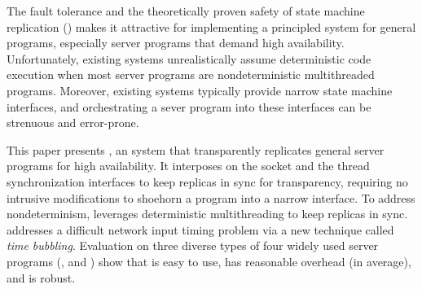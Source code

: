 The fault tolerance and the theoretically proven safety of state machine
replication (\smr) makes it attractive for implementing a principled
system for general programs, especially server programs that demand high
availability.  Unfortunately, existing \smr systems unrealistically assume
deterministic code execution when most server programs are
nondeterministic multithreaded programs.  Moreover, existing \smr systems
typically provide narrow state machine interfaces, and orchestrating a
sever program into these interfaces can be strenuous and error-prone.

This paper presents \xxx, an \smr system that transparently replicates
general server programs for high availability.  It interposes on the
socket and the thread synchronization interfaces to keep replicas in sync
for transparency, requiring no intrusive modifications to shoehorn a
program into a narrow interface.  To address nondeterminism, \xxx
leverages deterministic multithreading to keep replicas in sync.  \xxx
addresses a difficult network input timing problem via a new technique
called \emph{time bubbling}. Evaluation on three diverse types of four
widely used server programs (\eg, \apache and \clamav) show that \xxx is
easy to use, has reasonable overhead (\overhead in average), and is robust.
